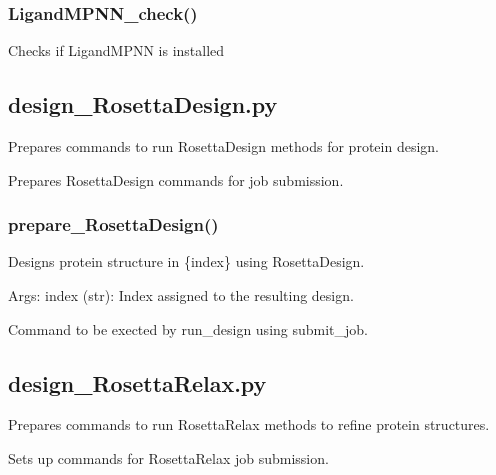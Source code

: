 \documentclass[10pt]{extarticle}
\begin{document}
\subsubsection{LigandMPNN\_check()}
Checks if LigandMPNN is installed
\subsection{design\_RosettaDesign.py}
Prepares commands to run RosettaDesign methods for protein design.

\par\vspace*{0.5\baselineskip}
{
\begin{description}[noitemsep,topsep=0pt,parsep=0pt,labelwidth=5cm,leftmargin=!,labelindent=0pt,labelsep=0.2cm,itemsep=0pt]
\item[\textcolor{mpgAccentBlue!75!white}{prepare\_RosettaDesign\dotfill}] Prepares RosettaDesign commands for job submission.
\end{description}
}
\subsubsection{prepare\_RosettaDesign()}
Designs protein structure in \{index\} using RosettaDesign.

Args:
index (str): Index assigned to the resulting design.

\par\vspace*{0.5\baselineskip}
{
\begin{description}[noitemsep,topsep=0pt,parsep=0pt,labelwidth=5cm,leftmargin=!,labelindent=0pt,labelsep=0.2cm,itemsep=0pt]
\item[\textcolor{mpgAccentBlue!75!white}{cmd (str)\dotfill}] Command to be exected by run\_design using submit\_job.
\end{description}
}
\subsection{design\_RosettaRelax.py}
Prepares commands to run RosettaRelax methods to refine protein structures.

\par\vspace*{0.5\baselineskip}
{
\begin{description}[noitemsep,topsep=0pt,parsep=0pt,labelwidth=5cm,leftmargin=!,labelindent=0pt,labelsep=0.2cm,itemsep=0pt]
\item[\textcolor{mpgAccentBlue!75!white}{prepare\_RosettaRelax\dotfill}] Sets up commands for RosettaRelax job submission.
\end{description}
}
\end{document}
